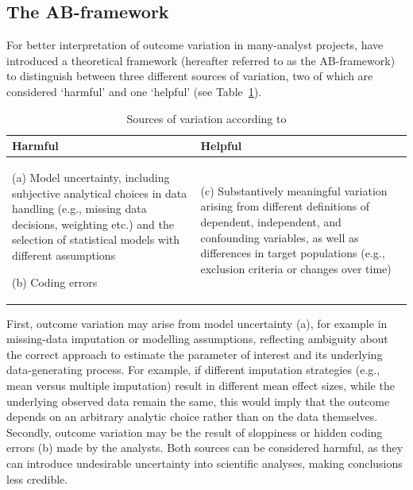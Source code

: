 \documentclass{article}
\begin{document}
\subsection*{The AB-framework}
For better interpretation of outcome variation in many-analyst projects, \citet{auspurg_toward_2024} have introduced a theoretical framework (hereafter referred to as the AB-framework) to distinguish between three different sources of variation, two of which are considered `harmful' and one `helpful' (see Table~\ref{tab:AB_framework}). 

\begin{table}[H]
\centering
\caption{Sources of variation according to \citet{auspurg_toward_2024}}
\label{tab:AB_framework}
\begin{threeparttable}
\footnotesize
\setlength{\tabcolsep}{10pt}
\renewcommand{\arraystretch}{1.2}

\begin{tabular}{
>{\RaggedRight\arraybackslash}p{7.2cm}
>{\RaggedRight\arraybackslash}p{7.2cm}
}
\toprule
\textbf{Harmful} & \textbf{Helpful} \\
\midrule

(a) Model uncertainty, including subjective analytical choices in data handling (e.g., missing data decisions, weighting etc.) and the selection of statistical models with different assumptions

\vspace{0.4em}
(b) Coding errors
&
(c) Substantively meaningful variation arising from different definitions of dependent, independent, and confounding variables, as well as differences in target populations (e.g., exclusion criteria or changes over time) \\

\bottomrule
\end{tabular}

\end{threeparttable}
\end{table}

First, outcome variation may arise from model uncertainty (a), for example in missing-data imputation or modelling assumptions, reflecting ambiguity about the correct approach to estimate the parameter of interest and its underlying data-generating process. For example, if different imputation strategies (e.g., mean versus multiple imputation) result in different mean effect sizes, while the underlying observed data remain the same, this would imply that the outcome depends on an arbitrary analytic choice rather than on the data themselves. Secondly, outcome variation may be the result of sloppiness or hidden coding errors (b) made by the analysts. Both sources can be considered harmful, as they can introduce undesirable uncertainty into scientific analyses, making conclusions less credible.
\end{document}
